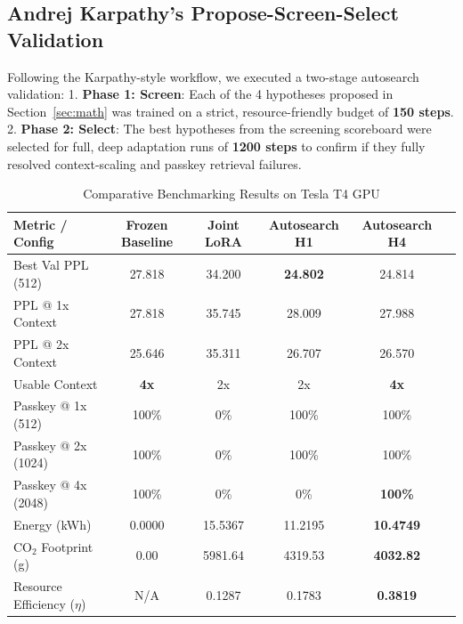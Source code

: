 \documentclass[11pt,journal,compsoc]{IEEEtran}
\begin{document}
\subsection{Andrej Karpathy's Propose-Screen-Select Validation}
Following the Karpathy-style workflow, we executed a two-stage autosearch validation:
1.  \textbf{Phase 1: Screen}: Each of the 4 hypotheses proposed in Section~\ref{sec:math} was trained on a strict, resource-friendly budget of \textbf{150 steps}.
2.  \textbf{Phase 2: Select}: The best hypotheses from the screening scoreboard were selected for full, deep adaptation runs of \textbf{1200 steps} to confirm if they fully resolved context-scaling and passkey retrieval failures.

\begin{table}[h]
\centering
\caption{Comparative Benchmarking Results on Tesla T4 GPU}
\label{tab:scoreboard}
\begin{tabular}{lccccc}
\toprule
\textbf{Metric / Config} & \textbf{Frozen Baseline} & \textbf{Joint LoRA} & \textbf{Autosearch H1} & \textbf{Autosearch H4} \\
\midrule
Best Val PPL (512) & 27.818 & 34.200 & \textbf{24.802} & 24.814 \\
PPL @ 1x Context & 27.818 & 35.745 & 28.009 & 27.988 \\
PPL @ 2x Context & 25.646 & 35.311 & 26.707 & 26.570 \\
Usable Context & \textbf{4x} & 2x & 2x & \textbf{4x} \\
\midrule
Passkey @ 1x (512) & 100\% & 0\% & 100\% & 100\% \\
Passkey @ 2x (1024) & 100\% & 0\% & 100\% & 100\% \\
Passkey @ 4x (2048) & 100\% & 0\% & 0\% & \textbf{100\%} \\
\midrule
Energy (kWh) & 0.0000 & 15.5367 & 11.2195 & \textbf{10.4749} \\
CO${}_2$ Footprint (g) & 0.00 & 5981.64 & 4319.53 & \textbf{4032.82} \\
Resource Efficiency ($\eta$) & N/A & 0.1287 & 0.1783 & \textbf{0.3819} \\
\bottomrule
\end{tabular}
\end{table}
\end{document}

